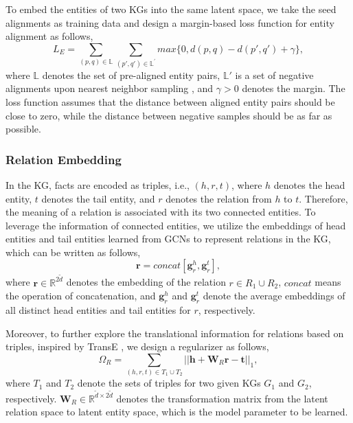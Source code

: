 \documentclass[letterpaper]{article} %
\begin{document}
To embed the entities of two KGs into the same latent space, we take
the seed alignments as training data and design a margin-based loss
function for entity alignment as follows,
\begin{equation}
L_E = \sum_{(p,q)\in \mathbb{L}} \sum_{(p',q')\in \mathbb{L}^{'}}
max\{0, d(p,q) - d(p',q') + \gamma\}, \label{loss_e}
\end{equation}
where $\mathbb{L}$ denotes the set of pre-aligned entity pairs,
$\mathbb{L}'$ is a set of negative alignments upon nearest neighbor
sampling \cite{wu2020neighborhood}, and $\gamma > 0$ denotes the margin.
The loss function
assumes that the distance between aligned entity pairs should be
close to zero, while the distance between negative samples should be
as far as possible.

\subsubsection{Relation Embedding}
In the KG, facts are encoded as triples, i.e., $(h,r,t)$, where $h$
denotes the head entity, $t$ denotes the tail entity, and $r$
denotes the relation from $h$ to $t$. Therefore, the meaning of a
relation is associated with its two connected entities. To leverage
the information of connected entities, we utilize the embeddings of
head entities and tail entities learned from GCNs to represent
relations in the KG, which can be written as follows,
\begin{equation}
\bm{r} =  concat[\bm{g}^h_r, \bm{g}^t_r],
\end{equation}
where $\bm{r} \in \mathbb{R}^{2\tilde{d}}$ denotes the embedding of
the relation $r \in R_1 \cup R_2$, $concat$ means the operation of concatenation, and
$\bm{g}^h_r$ and $\bm{g}^t_r$ denote the average embeddings of all
distinct head entities and tail entities for $r$, respectively.

Moreover, to further explore the translational information for
relations based on triples, inspired by TransE
\cite{bordes2013translating}, we design a regularizer as follows,
\begin{equation}
\Omega_R = \sum_{(h,r,t) \in T_1 \cup T_2} ||
\bm{h}+\bm{W}_{R}\bm{r}-\bm{t} ||_1,
\end{equation}
where $T_1$ and $T_2$ denote the sets of triples for two given KGs
$G_1$ and $G_2$, respectively. $\bm{W}_{R} \in \mathbb{R}^{\tilde{d}
\times 2\tilde{d}}$ denotes the transformation matrix from the
latent relation space to latent entity space, which is the model
parameter to be learned. %
\end{document}
